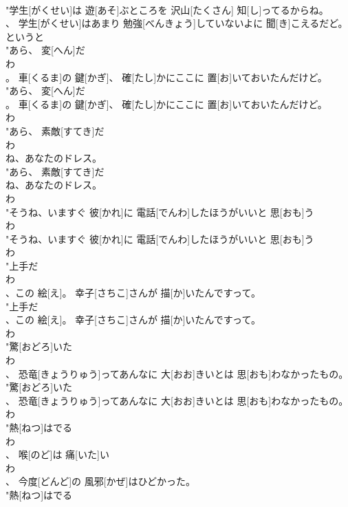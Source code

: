 \documentclass[8pt]{extreport}
\begin{document}
\begin{CJK}{UTF8}{min}
\\	"学生[がくせい]は 遊[あそ]ぶところを 沢山[たくさん] 知[し]ってるからね。
\\	、 学生[がくせい]はあまり 勉強[べんきょう]していないよに 聞[き]こえるだど。
\\	というと
\\	"あら、 変[へん]だ
\\	わ
\\	。 車[くるま]の 鍵[かぎ]、 確[たし]かにここに 置[お]いておいたんだけど。
\\	"あら、 変[へん]だ
\\	。 車[くるま]の 鍵[かぎ]、 確[たし]かにここに 置[お]いておいたんだけど。
\\	わ
\\	"あら、 素敵[すてき]だ
\\	わ
\\	ね、あなたのドレス。
\\	"あら、 素敵[すてき]だ
\\	ね、あなたのドレス。
\\	わ
\\	"そうね、いますぐ 彼[かれ]に 電話[でんわ]したほうがいいと 思[おも]う
\\	わ
\\	"そうね、いますぐ 彼[かれ]に 電話[でんわ]したほうがいいと 思[おも]う
\\	わ
\\	"上手だ
\\	わ
\\	、この 絵[え]。 幸子[さちこ]さんが 描[か]いたんですって。
\\	"上手だ
\\	、この 絵[え]。 幸子[さちこ]さんが 描[か]いたんですって。
\\	わ
\\	"驚[おどろ]いた
\\	わ
\\	、 恐竜[きょうりゅう]ってあんなに 大[おお]きいとは 思[おも]わなかったもの。
\\	"驚[おどろ]いた
\\	、 恐竜[きょうりゅう]ってあんなに 大[おお]きいとは 思[おも]わなかったもの。
\\	わ
\\	"熱[ねつ]はでる
\\	わ
\\	、 喉[のど]は 痛[いた]い
\\	わ
\\	、 今度[どんど]の 風邪[かぜ]はひどかった。
\\	"熱[ねつ]はでる

\end{CJK}
\end{document}

